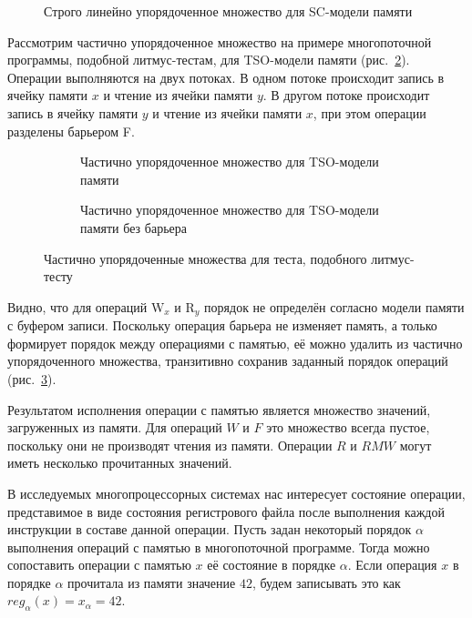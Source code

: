 \begin{figure}[htbp]
  \centerfloat{
    
  }
  \caption{Строго линейно упорядоченное множество для SC-модели памяти}
  \label{fig:posetSC-red}
\end{figure}

Рассмотрим частично упорядоченное множество на примере многопоточной
программы, подобной литмус-тестам, для TSO-модели памяти
(рис.~\cref{fig:litmus-f-poset-tso}). Операции выполняются на двух
потоках. В одном потоке происходит запись в ячейку памяти $x$ и
чтение из ячейки памяти $y$. В другом потоке происходит запись в
ячейку памяти $y$ и чтение из ячейки памяти $x$, при этом операции
разделены барьером F.

\begin{figure}[ht]
  \begin{subfigure}[b]{0.5\textwidth}
    \centering
    
    \caption{Частично упорядоченное множество для TSO-модели памяти}
    \label{fig:litmus-f-poset-tso}
  \end{subfigure}%
  \begin{subfigure}[b]{0.5\textwidth}
    \centering
    
    \caption{Частично упорядоченное множество для TSO-модели памяти без барьера}
    \label{fig:litmus-f-poset-tso-nof}
  \end{subfigure}
  \caption{Частично упорядоченные множества для теста, подобного литмус-тесту}
  \label{fig:litmus-f-poset}
\end{figure}

Видно, что для операций $\text{W}_x$ и $\text{R}_y$ порядок не
определён согласно модели памяти с буфером записи. Поскольку операция
барьера не изменяет память, а только формирует порядок между
операциями с памятью, её можно удалить из частично упорядоченного
множества, транзитивно сохранив заданный порядок операций
(рис.~\cref{fig:litmus-f-poset-tso-nof}).

Результатом исполнения операции с памятью является множество
значений, загруженных из памяти. Для операций $W$ и $F$ это множество
всегда пустое, поскольку они не производят чтения из памяти. Операции
$R$ и $RMW$ могут иметь несколько прочитанных значений.

В исследуемых многопроцессорных системах нас интересует состояние
операции, представимое в виде состояния регистрового файла после
выполнения каждой инструкции в составе данной операции. Пусть задан
некоторый порядок $\alpha$ выполнения операций с памятью в
многопоточной программе. Тогда можно сопоставить операции с памятью
$x$ её состояние в порядке $\alpha$. Если операция $x$ в порядке
$\alpha$ прочитала из памяти значение $42$, будем записывать это как
$reg_{\alpha}(x) = x_{\alpha} = 42$.

